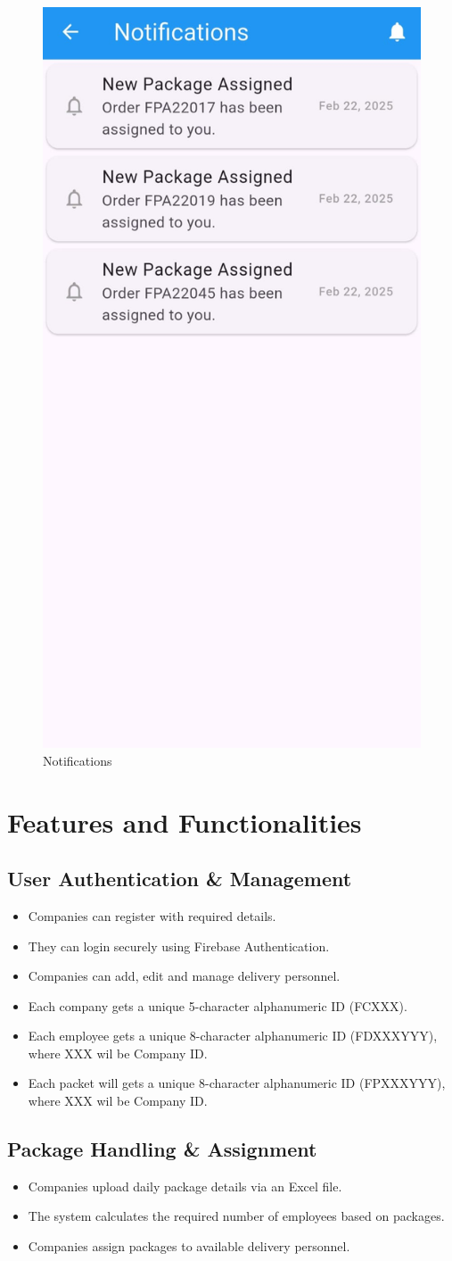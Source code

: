 \begin{figure}[H]
    \centering
    \includegraphics[width=0.24\linewidth]{4/Notification.jpg}
    \caption{Notifications}
    \label{fig:notificationl}
\end{figure}
\newpage
\section{Features and Functionalities}
\subsection{User Authentication \& Management}
\begin{itemize}
    \item Companies can register with required details.
    \item They can login securely using Firebase Authentication.
    \item Companies can add, edit and manage delivery personnel.
    \item Each company gets a unique 5-character alphanumeric ID (FCXXX).
    \item Each employee gets a unique 8-character alphanumeric ID (FDXXXYYY), where XXX wil be Company ID.
    \item Each packet will gets a unique 8-character alphanumeric ID (FPXXXYYY), where XXX wil be Company ID.
\end{itemize}
\subsection{Package Handling \& Assignment}
\begin{itemize}
    \item Companies upload daily package details via an Excel file.
    \item The system calculates the required number of employees based on packages.
    \item Companies assign packages to available delivery personnel.
\end{itemize}
